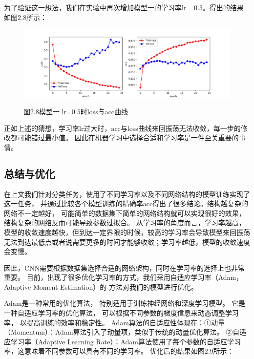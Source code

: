 \documentclass[10.5pt,compsoc,UTF8]{CjC}
\theoremstyle{mystyle}
\begin{document}
为了验证这一想法，我们在实验中再次增加模型一的学习率lr =0.5。得出的结果如图2.8所示：

\begin{figure}[htbp]
\centering

\centerline{\includegraphics[width=1\linewidth]{CNN29.png}}
\heiti 图2.8\quad  模型一 lr=0.5时loss与acc曲线
\label{fig1}
\end{figure}

\vspace {-6mm}
正如上述的猜想，学习率lr过大时，acc与loss曲线来回振荡无法收敛，每一步的修改都可能错过最小值。
因此在机器学习中选择合适和学习率是一件至关重要的事情。


\subsection{总结与优化}

在上文我们针对分类任务，使用了不同学习率以及不同网络结构的模型训练实现了这一任务，
并通过比较各个模型训练的精确率acc得出了很多结论。结构越复杂的网络不一定越好，
可能简单的数据集下简单的网络结构就可以实现很好的效果，结构复杂的网络反而可能导致参数过拟合。
从学习率的角度而言，学习率越高，模型的收敛速度越快，但到达一定界限的时候，较高的学习率会导致模型来回振荡
无法到达最低点或者说需要更多的时间才能够收敛；学习率越低，模型的收敛速度会变慢。

因此，CNN需要根据数据集选择合适的网络架构，同时在学习率的选择上也非常重要。
目前，出现了很多优化学习率的方式，我们采用自适应学习率（Adam，Adaptive Moment Estimation）的
方法对我们的模型进行优化。

Adam是一种常用的优化算法，
特别适用于训练神经网络和深度学习模型。
它是一种自适应学习率的优化算法，
可以根据不同参数的梯度信息来动态调整学习率，
以提高训练的效率和稳定性。
Adam算法的自适应性体现在：①动量（Momentum）：Adam算法引入了动量项，类似于传统的动量优化算法。
②自适应学习率（Adaptive Learning Rate）：Adam算法使用了每个参数的自适应学习率，这意味着不同参数可以具有不同的学习率。
优化后的结果如图2.9所示：
\end{document}
